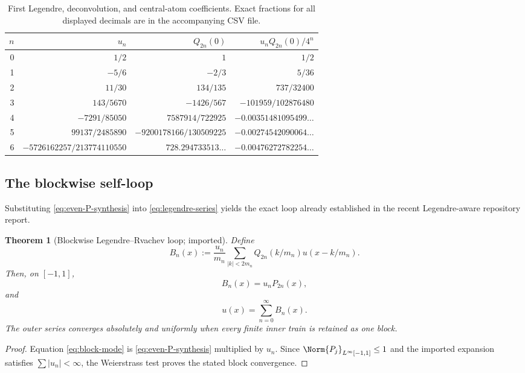 \documentclass[11pt,oneside]{article}
\numberwithin{equation}{section}
\newtheorem{theorem}{Theorem}[section]
\theoremstyle{definition}
\theoremstyle{remark}
\begin{document}
\begin{table}[H]
\centering
\small
\begin{tabular}{@{}rrrr@{}}
\toprule
$n$ & $u_n$ & $Q_{2n}(0)$ & $u_nQ_{2n}(0)/4^n$\\
\midrule
0 & $1/2$ & $1$ & $1/2$\\
1 & $-5/6$ & $-2/3$ & $5/36$\\
2 & $11/30$ & $134/135$ & $737/32400$\\
3 & $143/5670$ & $-1426/567$ & $-101959/102876480$\\
4 & $-7291/85050$ & $7587914/722925$ & $-0.00351481095499\ldots$\\
5 & $99137/2485890$ & $-9200178166/130509225$ & $-0.00274542090064\ldots$\\
6 & $-5726162257/213774110550$ & $728.294733513\ldots$ & $-0.00476272782254\ldots$\\
\bottomrule
\end{tabular}
\caption{First Legendre, deconvolution, and central-atom coefficients.  Exact
fractions for all displayed decimals are in the accompanying CSV file.}
\label{tab:first-coefficients}
\end{table}

\subsection{The blockwise self-loop}

Substituting \eqref{eq:even-P-synthesis} into
\eqref{eq:legendre-series} yields the exact loop already established in the
recent Legendre-aware repository report.

\begin{theorem}[Blockwise Legendre--Rvachev loop; imported]
\label{thm:block-loop}
Define
\begin{equation}
 B_n(x):=\frac{u_n}{m_n}
 \sum_{|k|<2m_n}Q_{2n}(k/m_n)u(x-k/m_n).
 \label{eq:block-def}
\end{equation}
Then, on $[-1,1]$,
\begin{equation}
 B_n(x)=u_nP_{2n}(x),
 \label{eq:block-mode}
\end{equation}
and
\begin{equation}
 \boxed{u(x)=\sum_{n=0}^{\infty}B_n(x).}
 \label{eq:block-loop}
\end{equation}
The outer series converges absolutely and uniformly when every finite inner
train is retained as one block.
\end{theorem}

\begin{proof}
Equation \eqref{eq:block-mode} is
\eqref{eq:even-P-synthesis} multiplied by $u_n$.  Since
$\Norm{P_j}_{L^\infty[-1,1]}\le1$ and the imported expansion satisfies
$\sum|u_n|<\infty$, the Weierstrass test proves the stated block convergence.
\end{proof}
\end{document}
